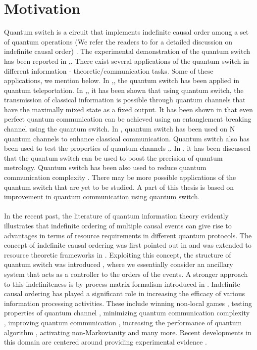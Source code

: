\section{Motivation}
Quantum switch is a circuit that implements indefinite causal order among a set
of quantum operations (We refer the readers to \cite{OCB_12} for a detailed discussion
on indefinite causal order) \cite{chiribella_2009}. The experimental demonstration of the quantum
switch has been reported in \cite{PMACADHRBW_15},\cite{RRFAZPBW_17}. There exist several applications of the
quantum switch in different information - theoretic/communication tasks. Some of
these applications, we mention below. In \cite{mukhopadhyay_2020},\cite{8966996}, the quantum switch has
been applied in quantum teleportation. In \cite{ESC_18},\cite{PhysRevA.103.062610}, it has been shown that
using quantum switch, the transmission of classical information is possible through
quantum channels that have the maximally mixed state as a fixed output. It has been
shown in \cite{CBBGARSAK_21} that even perfect quantum communication can be achieved using
an entanglement breaking channel using the quantum switch. In \cite{procopio_2019}, quantum
switch has been used on N quantum channels to enhance classical communication.
Quantum switch also has been used to test the properties of quantum channels
\cite{PhysRevA.86.040301},\cite{ACB_14}. In \cite{PhysRevLett.124.190503}, it has been discussed that the quantum switch can be used
to boost the precision of quantum metrology. Quantum switch has been also used
to reduce quantum communication complexity \cite{GFAC_16}. There may be more possible
applications of the quantum switch that are yet to be studied. A part of this thesis
is based on improvement in quantum communication using quantum switch.\\\\
In the recent past, the literature of quantum information theory evidently illustrates that indefinite ordering of multiple causal events can give rise to advantages in terms of resource requirements in different quantum protocols. The concept of indefinite causal ordering was first pointed out in \cite{H_05, H_07} and was extended to resource theoretic frameworks in \cite{CDPV_13}. Exploiting this concept, the structure of quantum switch was introduced \cite{CDPV_13}, where we essentially consider an ancillary system that acts as a controller to the orders of the events. A stronger approach to this indefiniteness is by process matrix formalism introduced in \cite{OCB_12}. Indefinite causal ordering has played a significant role in increasing the efficacy of various information processing activities. These include winning non-local games \cite{OCB_12}, testing properties of quantum channel \cite{C_12}, minimizing quantum communication complexity \cite{GFAC_16}, improving quantum communication \cite{ESC_18, CBBGARSAK_21,Mitra_2023}, increasing the performance of quantum algorithm \cite{ACB_14}, activating non-Markovianity \cite{MB_22,agm_23} and many more. Recent developments in this domain are centered around providing experimental evidence \cite{PMACADHRBW_15, RRFAZPBW_17, GGKCBRW_18}. 

